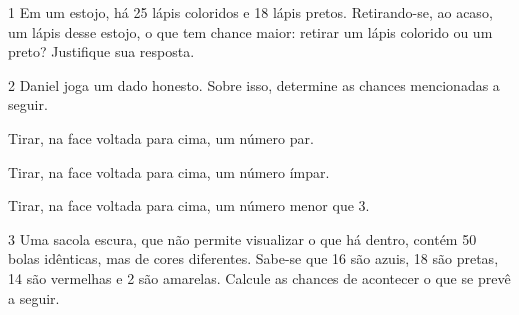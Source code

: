 \num{1} Em um estojo, há 25 lápis coloridos e 18 lápis pretos. Retirando-se, ao
acaso, um lápis desse estojo, o que tem chance maior: retirar um lápis
colorido ou um preto? Justifique sua resposta.

\begin{mdframed}[linewidth=2pt,linecolor=salmao,roundcorner=2pt]
\vspace{2cm}
\end{mdframed}

\num{2} Daniel joga um dado honesto. Sobre isso, determine as chances mencionadas a seguir.

\begin{escolha}
\item
  Tirar, na face voltada para cima, um número par.


\item
  Tirar, na face voltada para cima, um número ímpar.


\item
  Tirar, na face voltada para cima, um número menor que 3.

\end{escolha}

\num{3} Uma sacola escura, que não permite visualizar o que há dentro, contém
50 bolas idênticas, mas de cores diferentes. Sabe-se que 16 são azuis,
18 são pretas, 14 são vermelhas e 2 são amarelas. Calcule as chances de
acontecer o que se prevê a seguir.

